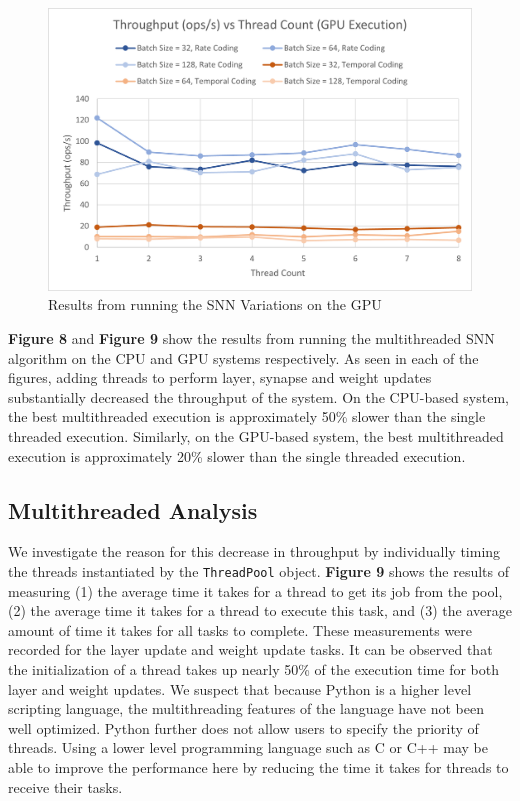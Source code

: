 \documentclass[journal]{IEEEtran}
\begin{document}
\begin{figure}[!t]
\centering
\includegraphics[width=\linewidth]{snn_results2.png}
\caption{Results from running the SNN Variations on the GPU}
\label{fig_sim}
\end{figure}

\textbf{Figure 8} and \textbf{Figure 9} show the results from running the multithreaded SNN algorithm on the CPU and GPU systems respectively. As seen in each of the figures, adding threads to perform layer, synapse and weight updates substantially decreased the throughput of the system. On the CPU-based system, the best multithreaded execution is approximately 50\% slower than the single threaded execution. Similarly, on the GPU-based system, the best multithreaded execution is approximately 20\% slower than the single threaded execution.


\subsection{Multithreaded Analysis}

We investigate the reason for this decrease in throughput by individually timing the threads instantiated by the \verb|ThreadPool| object. \textbf{Figure 9} shows the results of measuring (1) the average time it takes for a thread to get its job from the pool, (2) the average time it takes for a thread to execute this task, and (3) the average amount of time it takes for all tasks to complete. These measurements were recorded for the layer update and weight update tasks. It can be observed that the initialization of a thread takes up nearly 50\% of the execution time for both layer and weight updates. We suspect that because Python is a higher level scripting language, the multithreading features of the language have not been well optimized. Python further does not allow users to specify the priority of threads. Using a lower level programming language such as C or C++ may be able to improve the performance here by reducing the time it takes for threads to receive their tasks. 
\end{document}

